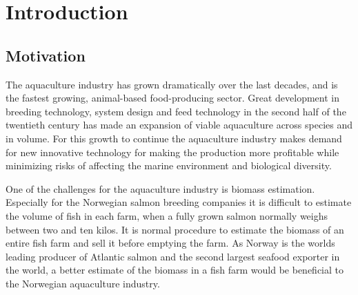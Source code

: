 \section{Introduction}\label{introduction}

\subsection{Motivation}\label{motivation}

The aquaculture industry has grown dramatically over the last decades, and is the fastest growing, animal-based food-producing sector. 
Great development in breeding technology, system design and feed technology in the second half of the twentieth century has made an expansion of viable aquaculture across species and in volume.
For this growth to continue the aquaculture industry makes demand for new innovative technology for making the production more profitable while minimizing risks of affecting the marine environment and biological diversity.\cite{website:aquaculture}

One of the challenges for the aquaculture industry is biomass estimation. Especially for the Norwegian salmon breeding companies it is difficult to estimate the volume of fish in each farm, when a fully grown salmon normally weighs between two and ten kilos.\cite{website:biomass} It is normal procedure to estimate the biomass of an entire fish farm and sell it before emptying the farm. As Norway is the worlds leading producer of Atlantic salmon and the second largest seafood exporter in the world, a better estimate of the biomass in a fish farm would be beneficial to the Norwegian aquaculture industry.\cite{website:aquaculture}

